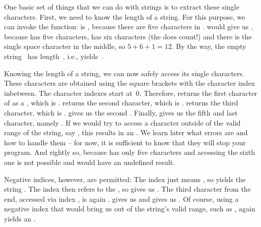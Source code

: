 One basic set of things that we can do with strings is to extract these single characters.
First, we need to know the length of a string.
For this purpose, we can invoke the  function:
 is , because there are five characters in .
 would give us , because  has five characters,  has six characters (the  does count!) and there is the single space character in the middle, so $5+6+1=12$.
By the way, the empty string~\pythonIdx{\textquotedbl\textquotedbl} has length~, i.e.,  yields~.

Knowing the length of a string, we can now safely access its single characters.
These characters are obtained using the square brackets \pythonil{[]}\pythonIdx{[\idxdots]} with the character index inbetween.
The character indexes start at~0.
Therefore, \pythonIdx{[\idxdots]} returns the first character of  as a , which is \pythonIdx{\textquotedbl\idxdots\textquotedbl}.
 returns the second character, which is .
 returns the third character, which is .
\pythonIdx{[\idxdots]} gives us the second .
Finally,  gives us the fifth and last character, namely \pythonIdx{\textquotedbl\idxdots\textquotedbl}.
If we would try to access a character outside of the valid range of the string, say , this results in an .
We learn later what errors are and how to handle them -- for now, it is sufficient to know that they will stop your program.
And rightly so, because \pythonIdx{\textquotedbl\idxdots\textquotedbl} has only five characters and accessing the sixth one is not possible and would have an undefined result.

Negative indices, however, are permitted:
The index  just means , so  yields the string .
The index  then refers to the , so  gives us .
The third character from the end, accessed via index , is again .
 gives us  and  gives us .
Of course, using a negative index that would bring us out of the string's valid range, such as , again yields an .

